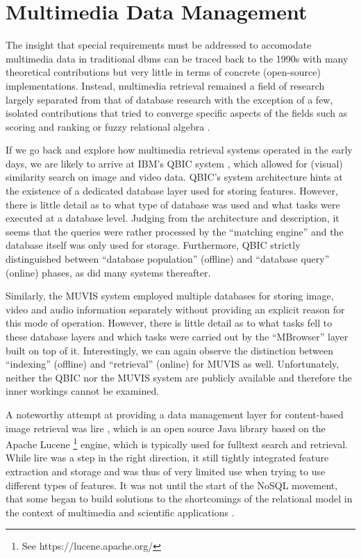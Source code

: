 \chapter{Multimedia Data Management}
\label{chapter:theory_multimedia_database}

The insight that special requirements must be addressed to accomodate multimedia data in traditional \acrshort{dbms} can be traced back to the 1990s \cite{Marcus:1996Foundations,Adjeroh:1997Multimedia} with many theoretical contributions but very little in terms of concrete (open-source) implementations. Instead, multimedia retrieval remained a field of research largely separated from that of database research with the exception of a few, isolated contributions that tried to converge specific aspects of the fields such as scoring and ranking \cite{Chengkai:2005RankSQL,Zhang:2006Boolean} or fuzzy relational algebra \cite{Montesi:1999Similarity}.

If we go back and explore how multimedia retrieval systems operated in the early days, we are likely to arrive at IBM's QBIC system \cite{Flickner:1995Query}, which allowed for (visual) similarity search on image and video data. QBIC's system architecture hints at the existence of a dedicated database layer used for storing features. However, there is little detail as to what type of database was used and what tasks were executed at a database level. Judging from the architecture and description, it seems that the queries were rather processed by the ``matching engine'' and the database itself was only used for storage. Furthermore, QBIC strictly distinguished between ``database population'' (offline) and ``database query'' (online) phases, as did many systems thereafter.

Similarly, the MUVIS \cite{Kiranyaz:2003Muvis} system employed multiple databases for storing image, video and audio information separately without providing an explicit reason for this mode of operation. However, there is little detail as to what tasks fell to these database layers and which tasks were carried out by the ``MBrowser'' layer built on top of it. Interestingly, we can again observe the distinction between ``indexing'' (offline) and ``retrieval'' (online) for MUVIS as well. Unfortunately, neither the QBIC nor the MUVIS system are publicly available and therefore the inner workings cannot be examined.

A noteworthy attempt at providing a data management layer for content-based image retrieval was \acrfull{lire} \cite{Luc:2008LIRE}, which is an open source Java library based on the Apache Lucene \footnote{See https://lucene.apache.org/} engine, which is typically used for fulltext search and retrieval. While \acrshort{lire} was a step in the right direction, it still tightly integrated feature extraction and storage and was thus of very limited use when trying to use different types of features. It was not until the start of the NoSQL movement, that some began to build solutions to the shortcomings of the relational model in the context of multimedia and scientific applications \cite{Silva:2010SimDB,Stonebraker:2013SciDB}.

